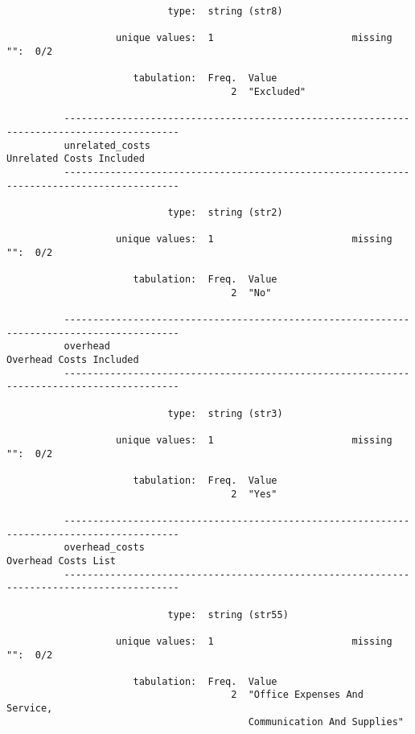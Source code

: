 \documentclass{article}
\begin{document}
\begin{verbatim}
                            type:  string (str8)
          
                   unique values:  1                        missing "":  0/2
          
                      tabulation:  Freq.  Value
                                       2  "Excluded"
          
          ------------------------------------------------------------------------------------------
          unrelated_costs                                                   Unrelated Costs Included
          ------------------------------------------------------------------------------------------
          
                            type:  string (str2)
          
                   unique values:  1                        missing "":  0/2
          
                      tabulation:  Freq.  Value
                                       2  "No"
          
          ------------------------------------------------------------------------------------------
          overhead                                                           Overhead Costs Included
          ------------------------------------------------------------------------------------------
          
                            type:  string (str3)
          
                   unique values:  1                        missing "":  0/2
          
                      tabulation:  Freq.  Value
                                       2  "Yes"
          
          ------------------------------------------------------------------------------------------
          overhead_costs                                                         Overhead Costs List
          ------------------------------------------------------------------------------------------
          
                            type:  string (str55)
          
                   unique values:  1                        missing "":  0/2
          
                      tabulation:  Freq.  Value
                                       2  "Office Expenses And Service,
                                          Communication And Supplies"
          

\end{verbatim}
\end{document}
